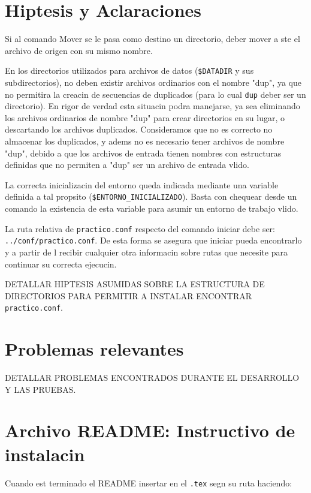 \documentclass[12pt]{article}
\begin{document}
\tableofcontents
\clearpage

\section{Hiptesis y Aclaraciones}

Si al comando Mover se le pasa como destino un directorio, deber mover a ste el archivo de origen con su mismo nombre.

En los directorios utilizados para archivos de datos (\verb|$DATADIR| y sus subdirectorios), no deben existir archivos ordinarios con el nombre "dup", ya que no permitira la creacin de secuencias de duplicados (para lo cual \verb|dup| deber ser un directorio). En rigor de verdad esta situacin podra manejarse, ya sea eliminando los archivos ordinarios de nombre "dup" para crear directorios en su lugar, o descartando los archivos duplicados. Consideramos que no es correcto no almacenar los duplicados, y adems no es necesario tener archivos de nombre "dup", debido a que los archivos de entrada tienen nombres con estructuras definidas que no permiten a "dup" ser un archivo de entrada vlido.

La correcta inicializacin del entorno queda indicada mediante una variable definida a tal propsito (\verb|$ENTORNO_INICIALIZADO|). Basta con chequear desde un comando la existencia de esta variable para asumir un entorno de trabajo vlido.

La ruta relativa de \verb|practico.conf| respecto del comando iniciar debe ser: \verb|../conf/practico.conf|. De esta forma se asegura que iniciar pueda encontrarlo y a partir de l recibir cualquier otra informacin sobre rutas que necesite para continuar su correcta ejecucin.

DETALLAR HIPTESIS ASUMIDAS SOBRE LA ESTRUCTURA DE DIRECTORIOS PARA PERMITIR A INSTALAR ENCONTRAR \verb|practico.conf|.

\section{Problemas relevantes}

DETALLAR PROBLEMAS ENCONTRADOS DURANTE EL DESARROLLO Y LAS PRUEBAS.



\section{Archivo README: Instructivo de instalacin}
Cuando est terminado el README insertar en el \verb|.tex| segn su ruta haciendo:
\begin{verbatim}

\end{verbatim}
\end{document}
